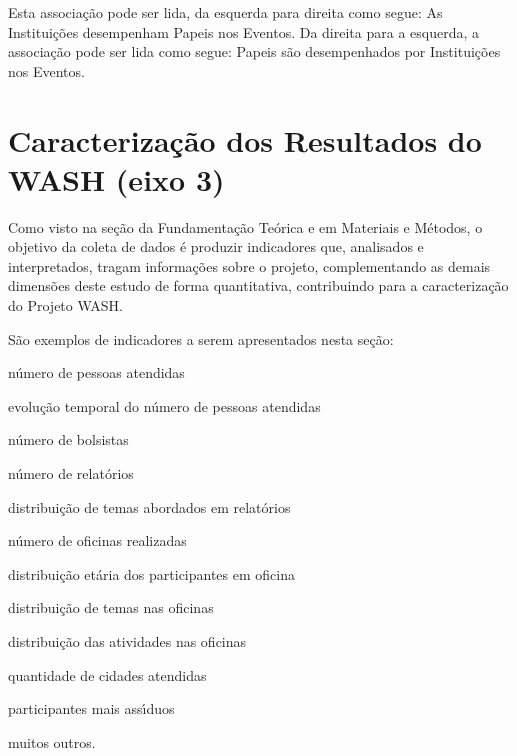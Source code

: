 \documentclass[
12pt,		%
openright,	%
twoside,  %
a4paper,			%
chapter=TITLE,		%
english,			%
french,				%
spanish,			%
brazil				%
]{USPSC-classe/USPSC}
\begin{document}
Esta associa\c{c}\~ao pode ser lida, da esquerda para direita como segue: \textquotedbl As Institui\c{c}\~oes desempenham Papeis nos Eventos\textquotedbl . Da direita para a esquerda, a associa\c{c}\~ao pode ser lida como segue: \textquotedbl Papeis s\~ao desempenhados por Institui\c{c}\~oes nos Eventos\textquotedbl .














\section[Caracteriza\c{c}\~ao dos Resultados do WASH (eixo 3)]{Caracteriza\c{c}\~ao dos Resultados do WASH (eixo 3)}\label{Caracteriza\c{c}\~ao dos Resultados do WASH (eixo 3)}
Como visto na se\c{c}\~ao da Fundamenta\c{c}\~ao Te\'orica e em Materiais e M\'etodos, o objetivo da coleta de dados \'e produzir indicadores que, analisados e interpretados, tragam informa\c{c}\~oes sobre o projeto, complementando as demais dimens\~oes deste estudo de forma quantitativa, contribuindo para a caracteriza\c{c}\~ao do Projeto WASH.














S\~ao exemplos de indicadores a serem apresentados nesta se\c{c}\~ao:















\begin{alineas}
\item n\'umero de pessoas atendidas
\item evolu\c{c}\~ao temporal do n\'umero de pessoas atendidas
\item n\'umero de bolsistas
\item n\'umero de relat\'orios
\item distribui\c{c}\~ao de temas abordados em relat\'orios
\item n\'umero de oficinas realizadas
\item distribui\c{c}\~ao et\'aria dos participantes em oficina
\item distribui\c{c}\~ao de temas nas oficinas
\item distribui\c{c}\~ao das atividades nas oficinas
\item quantidade de cidades atendidas
\item participantes mais ass\'{\i}duos
\item muitos outros.
\end{alineas}
\end{document}
